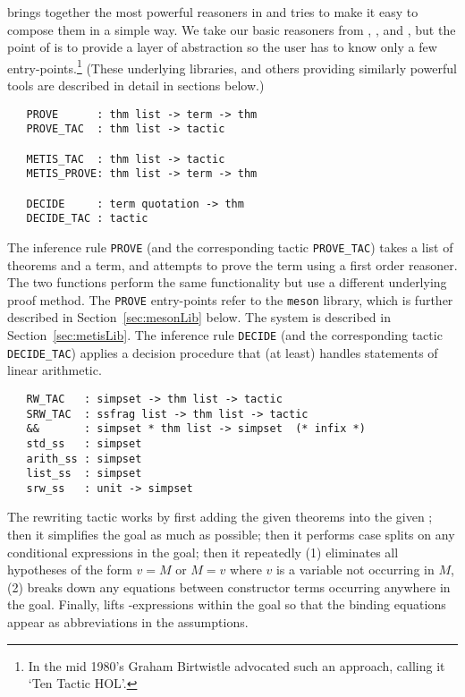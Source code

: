  brings together the most powerful reasoners in \HOL{} and
tries to make it easy to compose them in a simple way. We take our basic
reasoners from , , and ,
but the point of  is to provide a layer of abstraction so
the user has to know only a few entry-points.\footnote{In the mid 1980's
Graham Birtwistle advocated such an approach, calling it `Ten Tactic
HOL'.} (These underlying libraries, and others providing similarly
powerful tools are described in detail in sections below.)
\begin{hol}
\begin{verbatim}
   PROVE      : thm list -> term -> thm
   PROVE_TAC  : thm list -> tactic

   METIS_TAC  : thm list -> tactic
   METIS_PROVE: thm list -> term -> thm

   DECIDE     : term quotation -> thm
   DECIDE_TAC : tactic
\end{verbatim}
\end{hol}
The inference rule \texttt{PROVE} (and the corresponding tactic
\texttt{PROVE\_TAC}) takes a list of theorems and a term, and attempts
to prove the term using a first order reasoner.  The two 
functions perform the same functionality but use a different
underlying proof method.  The \texttt{PROVE} entry-points refer to the
\texttt{meson} library, which is further described in
Section~\ref{sec:mesonLib} below. The  system is described
in Section~\ref{sec:metisLib}.  The inference rule \texttt{DECIDE}
(and the corresponding tactic \texttt{DECIDE\_TAC}) applies a decision
procedure that (at least) handles statements of linear arithmetic.

\begin{hol}
\begin{verbatim}
   RW_TAC   : simpset -> thm list -> tactic
   SRW_TAC  : ssfrag list -> thm list -> tactic
   &&       : simpset * thm list -> simpset  (* infix *)
   std_ss   : simpset
   arith_ss : simpset
   list_ss  : simpset
   srw_ss   : unit -> simpset
\end{verbatim}
\end{hol}
%
 The rewriting tactic  works by
first adding the given theorems into the given \simpset; then it
simplifies the goal as much as possible; then it performs case splits
on any conditional expressions in the goal; then it repeatedly (1)
eliminates all hypotheses of the form $v = M$ or $M = v$ where $v$ is
a variable not occurring in $M$, (2) breaks down any equations between
constructor terms occurring anywhere in the goal. Finally,
 lifts -expressions within the goal so that
the binding equations appear as
abbreviations in the
assumptions.

